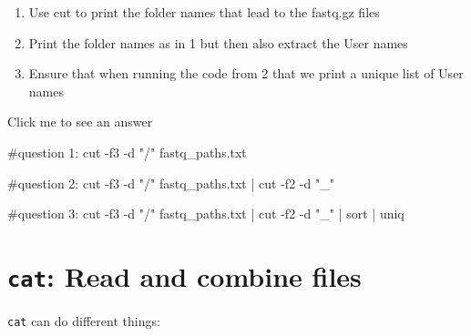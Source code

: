 \documentclass[
  letterpaper,
  DIV=11,
  numbers=noendperiod]{scrreprt}
\newenvironment{Shaded}{}{}
\newcommand{\AttributeTok}[1]{\textcolor[rgb]{0.84,0.23,0.29}{#1}}
\newcommand{\CommentTok}[1]{\textcolor[rgb]{0.42,0.45,0.49}{#1}}
\newcommand{\FunctionTok}[1]{\textcolor[rgb]{0.44,0.26,0.76}{#1}}
\newcommand{\KeywordTok}[1]{\textcolor[rgb]{0.84,0.23,0.29}{#1}}
\newcommand{\NormalTok}[1]{\textcolor[rgb]{0.14,0.16,0.18}{#1}}
\newcommand{\StringTok}[1]{\textcolor[rgb]{0.01,0.18,0.38}{#1}}
\providecommand{\tightlist}{%
  \setlength{\itemsep}{0pt}\setlength{\parskip}{0pt}}\usepackage{longtable,booktabs,array}
\begin{document}
\begin{tcolorbox}[enhanced jigsaw, rightrule=.15mm, colbacktitle=quarto-callout-caution-color!10!white, colframe=quarto-callout-caution-color-frame, colback=white, arc=.35mm, opacitybacktitle=0.6, coltitle=black, bottomtitle=1mm, breakable, bottomrule=.15mm, leftrule=.75mm, titlerule=0mm, title=\textcolor{quarto-callout-caution-color}{\faFire}\hspace{0.5em}{Exercise}, toprule=.15mm, toptitle=1mm, opacityback=0, left=2mm]

\begin{enumerate}
\def\labelenumi{\arabic{enumi}.}
\tightlist
\item
  Use cut to print the folder names that lead to the fastq.gz files
\item
  Print the folder names as in 1 but then also extract the User names
\item
  Ensure that when running the code from 2 that we print a unique list
  of User names
\end{enumerate}

Click me to see an answer

\begin{Shaded}
\begin{Highlighting}[]
\CommentTok{\#question 1:}
\FunctionTok{cut} \AttributeTok{{-}f3} \AttributeTok{{-}d} \StringTok{"/"}\NormalTok{ fastq\_paths.txt}

\CommentTok{\#question 2:}
\FunctionTok{cut} \AttributeTok{{-}f3} \AttributeTok{{-}d} \StringTok{"/"}\NormalTok{ fastq\_paths.txt }\KeywordTok{|} \FunctionTok{cut} \AttributeTok{{-}f2} \AttributeTok{{-}d} \StringTok{"\_"}

\CommentTok{\#question 3:}
\FunctionTok{cut} \AttributeTok{{-}f3} \AttributeTok{{-}d} \StringTok{"/"}\NormalTok{ fastq\_paths.txt }\KeywordTok{|} \FunctionTok{cut} \AttributeTok{{-}f2} \AttributeTok{{-}d} \StringTok{"\_"} \KeywordTok{|} \FunctionTok{sort} \KeywordTok{|} \FunctionTok{uniq}
\end{Highlighting}
\end{Shaded}

\end{tcolorbox}

\section{\texorpdfstring{\texttt{cat}: Read and combine
files}{cat: Read and combine files}}\label{cat-read-and-combine-files}

\texttt{cat} can do different things:
\end{document}
